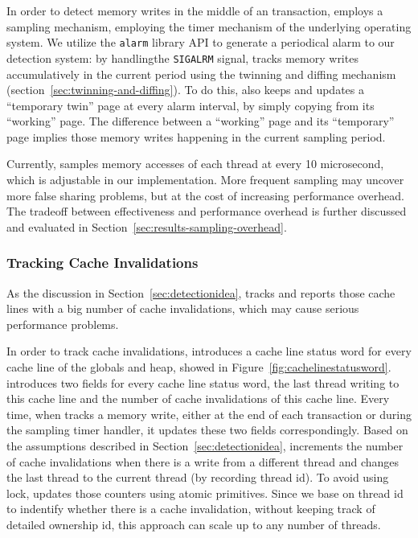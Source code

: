 In order to detect memory writes in the middle of an transaction, \SheriffDetect{} employs a sampling mechanism, employing the timer mechanism of the underlying operating system. 
We utilize the \texttt{alarm} library API to generate a periodical alarm to our detection system: by handlingthe \texttt{SIGALRM} signal, \SheriffDetect{} tracks memory writes accumulatively in the current period using the twinning and diffing mechanism (section~\ref{sec:twinning-and-diffing}). To do this, \SheriffDetect{} also keeps and updates a ``temporary twin'' page at every alarm interval, by simply copying from its ``working'' page. The difference between a ``working'' page and its ``temporary'' page implies those memory writes happening in the current sampling period. 

Currently, \SheriffDetect{} samples memory accesses of each thread at every 10 microsecond, which is  adjustable in our implementation. More frequent sampling may uncover more false sharing problems, but at the cost of increasing performance overhead. The tradeoff between effectiveness and performance overhead is further discussed and evaluated in Section~\ref{sec:results-sampling-overhead}. 

\subsubsection{Tracking Cache Invalidations}
\label{sec:invalidation}
As the discussion in Section~\ref{sec:detectionidea}, \SheriffDetect{} tracks and reports those cache lines with a big number of cache invalidations, which may cause serious performance problems. 

In order to track cache invalidations, \SheriffDetect{} introduces a cache line status word for every cache line of the globals and heap, showed in Figure~\ref{fig:cachelinestatusword}.  \SheriffDetect{} introduces two fields for every cache line status word, the last thread writing to this cache line and the number of cache invalidations of this cache line. 
Every time, when \SheriffDetect{} tracks a memory write, either at the end of each transaction or during the sampling timer handler, it updates these two fields correspondingly. Based on the assumptions described in Section~\ref{sec:detectionidea}, \SheriffDetect{} increments the number of cache invalidations when there is a write from a different thread and changes the last thread to the current thread (by recording thread id). To avoid using lock, \SheriffDetect{} updates those counters using atomic primitives. Since we base on thread id to indentify whether there is a cache invalidation, without keeping track of detailed ownership id, this approach can scale up to any number of threads.   

